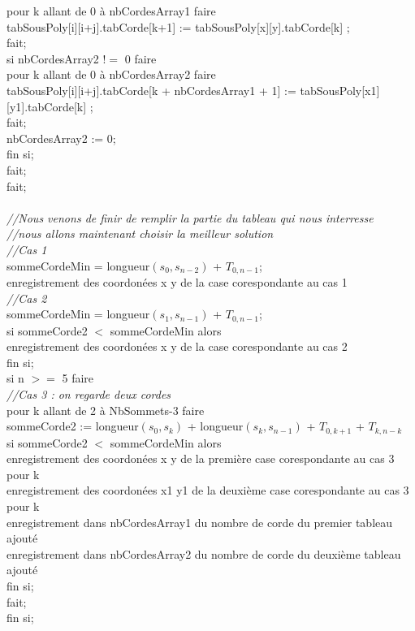 \documentclass[a4paper,10pt]{article}
\begin{document}
\begin{tabbing}
	\> \> pour k allant de 0 à nbCordesArray1 faire \\
	  \> \> \> tabSousPoly[i][i+j].tabCorde[k+1] := tabSousPoly[x][y].tabCorde[k] ; \\
	\> \> fait; \\
	\> \> si nbCordesArray2 $!=$ 0 faire \\
	  \> \> \> pour k allant de 0 à nbCordesArray2 faire \\
	    \> \> \> \> tabSousPoly[i][i+j].tabCorde[k + nbCordesArray1 + 1] := tabSousPoly[x1][y1].tabCorde[k] ; \\
	  \> \> \> fait;\\
	  \> \> \> nbCordesArray2 := 0;\\
	\> \> fin si; \\
  \> fait; \\
fait; \\
\\
\textit{//Nous venons de finir de remplir la partie du tableau qui nous interresse} \\
\textit{//nous allons maintenant choisir la meilleur solution} \\ 
\textit{//Cas 1} \\
sommeCordeMin = longueur$(s_0, s_{n-2})$ + $T_{0,n-1}$; \\
enregistrement des coordonées x y de la case corespondante au cas 1 \\
\textit{//Cas 2} \\
sommeCordeMin = longueur$(s_1, s_{n-1})$ + $T_{0,n-1}$; \\
si sommeCorde2 $<$ sommeCordeMin alors \\
  enregistrement des coordonées x y de la case corespondante au cas 2 \\
fin si; \\
si n $>=$ 5 faire \\
  \> \textit{//Cas 3 : on regarde deux cordes} \\
  \> pour k allant de 2 à NbSommets-3 faire \\
    \> \> sommeCorde2 := longueur$(s_0, s_{k})$ + longueur$(s_{k}, s_{n-1})$ + $T_{0,k+1}$ + $T_{k,n-k}$ \\
	  \> \> \> si sommeCorde2 $<$ sommeCordeMin alors \\
	     \> \> \> \>  enregistrement des coordonées x y de la première case corespondante au cas 3 pour k \\
	     \> \> \> \>  enregistrement des coordonées x1 y1 de la deuxième case corespondante au cas 3 pour k \\
	     \> \> \> \> enregistrement dans nbCordesArray1 du nombre de corde du premier tableau ajouté \\
	     \> \> \> \> enregistrement dans nbCordesArray2 du nombre de corde du deuxième tableau ajouté \\	      
	  \> \> \> fin si; \\
  \> fait; \\
fin si; \\


\end{tabbing}
\end{document}
